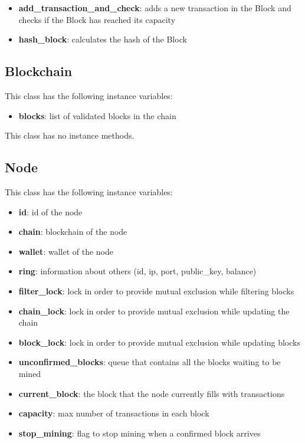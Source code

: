 \documentclass[conference]{IEEEtran}
\begin{document}
\begin{itemize}
\item \textbf{add\_transaction\_and\_check}: adds a new transaction in the Block and checks if the Block has reached its capacity
\item \textbf{hash\_block}: calculates the hash of the Block
\end{itemize}

\subsection{Blockchain}
This class has the following instance variables:

\begin{itemize}
\item \textbf{blocks}: list of validated blocks in the chain
\end{itemize}

This class has no instance methods.

\subsection{Node}
This class has the following instance variables:

\begin{itemize}
\item \textbf{id}: id of the node
\item \textbf{chain}: blockchain of the node
\item \textbf{wallet}: wallet of the node
\item \textbf{ring}: information about others (id, ip, port, public\_key, balance)

\item \textbf{filter\_lock}: lock in order to provide mutual exclusion while filtering blocks
\item \textbf{chain\_lock}: lock in order to provide mutual exclusion while updating the chain
\item \textbf{block\_lock}: lock in order to provide mutual exclusion while updating blocks
    
\item \textbf{unconfirmed\_blocks}: queue that contains all the blocks waiting to be mined
\item \textbf{current\_block}: the block that the node currently fills with transactions
\item \textbf{capacity}: max number of transactions in each block
\item \textbf{stop\_mining}: flag to stop mining when a confirmed block arrives
\end{itemize}
\end{document}

